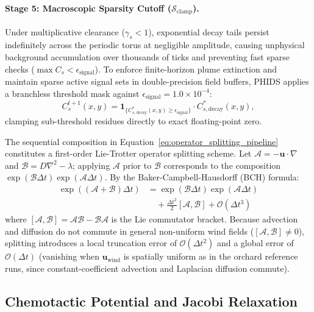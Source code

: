 \paragraph{Stage 5: Macroscopic Sparsity Cutoff ($\mathcal{S}_{\text{clamp}}$).}
Under multiplicative clearance ($\gamma_s < 1$), exponential decay tails persist indefinitely across the periodic torus at negligible amplitude, causing unphysical background accumulation over thousands of ticks and preventing fast sparse checks ($\max C_s < \epsilon_{\text{signal}}$). To enforce finite-horizon plume extinction and maintain sparse active signal sets in double-precision field buffers, PHIDS applies a branchless threshold mask against $\epsilon_{\text{signal}} = 1.0 \times 10^{-4}$:
\begin{equation}
  C_s^{t+1}(x, y) = \mathbf{1}_{\{ C_{s,\text{decay}}^{*}(x, y) \ge \epsilon_{\text{signal}} \}} \cdot C_{s,\text{decay}}^{*}(x, y),
  \label{eq:subnormal_clamping}
\end{equation}
clamping sub-threshold residues directly to exact floating-point zero.

The sequential composition in Equation~\eqref{eq:operator_splitting_pipeline} constitutes a first-order Lie-Trotter operator splitting scheme. Let $\mathcal{A} = -\mathbf{u} \cdot \nabla$ and $\mathcal{B} = D \nabla^2 - \lambda$; applying $\mathcal{A}$ prior to $\mathcal{B}$ corresponds to the composition $\exp(\mathcal{B}\Delta t)\exp(\mathcal{A}\Delta t)$. By the Baker-Campbell-Hausdorff (BCH) formula:
\begin{align}
  \exp\left( (\mathcal{A} + \mathcal{B})\Delta t \right) &= \exp(\mathcal{B}\Delta t) \exp(\mathcal{A}\Delta t) \nonumber \\
  &\quad + \frac{\Delta t^2}{2} [\mathcal{A}, \mathcal{B}] + \mathcal{O}(\Delta t^3)
  \label{eq:bch_splitting_error}
\end{align}
where $[\mathcal{A}, \mathcal{B}] = \mathcal{A}\mathcal{B} - \mathcal{B}\mathcal{A}$ is the Lie commutator bracket. Because advection and diffusion do not commute in general non-uniform wind fields ($[\mathcal{A}, \mathcal{B}] \neq 0$), splitting introduces a local truncation error of $\mathcal{O}(\Delta t^2)$ and a global error of $\mathcal{O}(\Delta t)$ (vanishing when $\mathbf{u}_{\text{wind}}$ is spatially uniform as in the orchard reference runs, since constant-coefficient advection and Laplacian diffusion commute).

\subsection{Chemotactic Potential and Jacobi Relaxation}
\label{subsec:chemotactic_potential}

